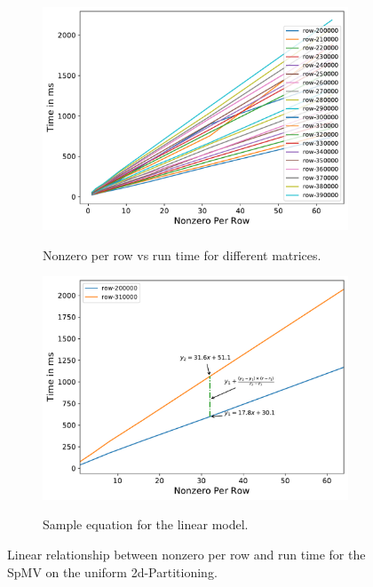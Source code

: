 \documentclass[sigconf,review,anonymous]{acmart}
\begin{document}
\begin{figure}[hbt!]
  \centering
  
  \begin{subfigure}[b]{.48\linewidth}
    \includegraphics[width=\linewidth]{figures/model_nonzero_perRow_for_particular_row_process_100.pdf}
    \label{fig:npr}
    \caption{Nonzero per row vs run time for different matrices.}
  \end{subfigure}
  \begin{subfigure}[b]{.48\linewidth}
    \includegraphics[width=\linewidth]{figures/prediction_equation.pdf}
    \label{fig:linearspmvmodel}
  
    \caption{Sample equation for the linear model.}
  \end{subfigure}

  \caption{Linear relationship between nonzero per row and run time for the SpMV on the uniform 2d-Partitioning.}
  \label{fig:ov-linear-model}
\end{figure}
\end{document}

